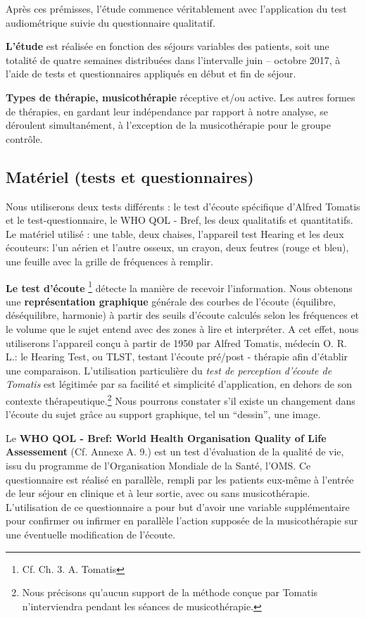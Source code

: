 Après ces prémisses, l'étude commence véritablement avec l'application du test
audiométrique suivie du questionnaire qualitatif.

\textbf{L'étude} est
réalisée en fonction des séjours variables des patients, soit une
totalité  de quatre semaines
distribuées dans l'intervalle juin --
octobre 2017,  à l'aide de tests et questionnaires appliqués en début
et fin de séjour.

\textbf{Types de thérapie, musicothérapie} réceptive et/ou active.
Les autres for\-mes de thérapies, en gardant
leur indépendance par rapport à notre analyse, se déroulent simultanément, à
l'exception de la musicothérapie pour le groupe contrôle.

\subsection{Matériel (tests et questionnaires)}
	Nous utiliserons deux tests différents :
	le test d'écoute spécifique d'Alfred Tomatis
	et le test-questionnaire, le WHO QOL - Bref, les deux qualitatifs et quantitatifs.
  Le matériel utilisé : une table, deux chaises, l'appareil
  test Hearing et les deux écouteurs: l'un aérien et l'autre osseux, un crayon, deux
  feutres (rouge et bleu), une feuille avec la grille de fréquences à
  remplir.

        \textbf{Le test d'écoute}
        \footnote{Cf. Ch. 3. A. Tomatis} détecte la manière de recevoir
        l'information.
Nous obtenons une
	\textbf{représentation graphique} générale des courbes de l'écoute
        (équilibre, déséquilibre, harmonie) à partir des seuils d'écoute
        calculés selon les fréquences et le volume que le sujet entend
        avec des zones à lire et interpréter.
	A cet effet, nous utiliserons l'appareil conçu à partir de 1950 par Alfred Tomatis, médecin
        O. R. L.: le Hearing Test, ou TLST, testant
        l'écoute pré/post - thérapie
        afin d'établir une comparaison.
        L'utilisation particulière du \textit{test de perception d'écoute de Tomatis}  est
légitimée par sa facilité et  simplicité d'application, en dehors de
son contexte thérapeutique.\footnote{Nous précisons qu'aucun support de la méthode conçue par
        Tomatis n'interviendra pendant les séances de musicothérapie.}
      Nous pourrons constater
      s'il existe un changement dans l'écoute du sujet grâce au support graphique, tel un ``dessin'',
      une image. %

        Le\textbf{ WHO QOL  - Bref:  World Health
   Organisation Quality of Life Assessement } (Cf. Annexe A. 9.) est un test d'évaluation de la qualité de vie, issu du
	programme de l'Organisation Mondiale de la Santé, l'OMS.
	Ce questionnaire est réalisé en parallèle, rempli par
        les patients eux-même à l'entrée de leur séjour en clinique et
        à leur sortie, avec ou sans musicothérapie.
 L'utilisation de ce questionnaire a pour but d'avoir
 une variable supplémentaire pour confirmer ou infirmer en
parallèle l'action supposée  de la musicothérapie sur une éventuelle
modification de l'écoute.

